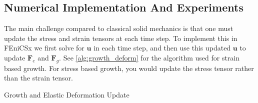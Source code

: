\subsection{Numerical Implementation And Experiments}
The main challenge compared to classical solid mechanics is that one must update the stress and strain tensors at each time step. To implement this in FEniCSx we first solve for $\mathbf{u}$ in each time step, and then use this updated $\mathbf{u}$ to update $\mathbf{F}_e$ and $\mathbf{F}_g$. See \ref{alg:growth_deform} for the algorithm used for strain based growth. For stress based growth, you would update the stress tensor rather than the strain tensor.
\begin{algorithm} 
    \caption{Growth and Elastic Deformation Update}\label{alg:growth_deform}
    \SetAlgoLined
\end{algorithm}
